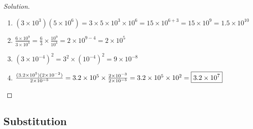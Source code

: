 \documentclass[crop=false,class=article,oneside]{standalone}
\begin{document}
            \begin{proof}[Solution]
                \
                \begin{enumerate}
                    \item $(3\times 10^{3})(5\times 10^{6})=%
                        3\times 5\times 10^{3}\times 10^{6}=%
                        15\times 10^{6+3}=%
                        15\times 10^{9}=%
                        \boxed{1.5\times 10^{10}}$
                    \item $\frac{6\times 10^{9}}{3\times 10^{4}}=%
                        \frac{6}{3}\times\frac{10^{9}}{10^{4}}=%
                        2\times 10^{9-4}=%
                        \boxed{2\times 10^{5}}$
                    \item $(3\times 10^{-4})^{2}=%
                        3^{2}\times (10^{-4})^{2}=%
                        \boxed{9\times 10^{-8}}$
                    \item 
                        $\frac{%
                            (3.2\times 10^{5})(2\times 10^{-2})%
                        }{%
                            2\times 10^{-5}%
                        }=%
                        3.2\times 10^{5}\times%
                        \frac{%
                            2\times 10^{-3}%
                        }{%
                            2\times 10^{-5}%
                        }=%
                        3.2\times 10^{5}\times 10^{2}=%
                        \boxed{3.2\times 10^{7}}$
                \end{enumerate}
            \end{proof}
    \subsection{Substitution}
\end{document}
